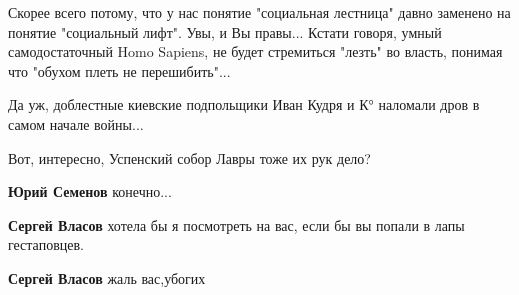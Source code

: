 \begin{itemize}
\begin{itemize}
 

Скорее всего потому, что у нас понятие "социальная лестница" давно заменено на
понятие "социальный лифт". Увы, и Вы правы... Кстати говоря, умный
самодостаточный Homo Sapiens, не будет стремиться "лезть" во власть, понимая
что "обухом плеть не перешибить"...

\end{itemize}

 

Да уж, доблестные киевские подпольщики Иван Кудря и К° наломали дров в самом
начале войны...

Вот, интересно, Успенский собор Лавры тоже их рук дело?

\begin{itemize}
 
\textbf{Юрий Семенов} конечно...

\begin{itemize}
 
\textbf{Сергей Власов} хотела бы я посмотреть на вас, если бы вы попали в лапы гестаповцев.


 
\textbf{Сергей Власов} жаль вас,убогих


 

\end{itemize}
\end{itemize}
\end{itemize}
